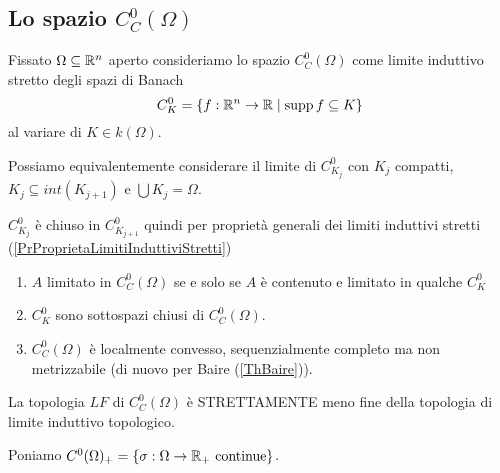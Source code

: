 \subsection{Lo spazio \texorpdfstring{$C_C^0(\Omega)$}{CC0Omega}}

\begin{definition}
Fissato $\Omega\subseteq\mathbb{R}^n$ aperto consideriamo lo spazio $C_C^0(\Omega)$ come limite induttivo stretto degli spazi di Banach
\[C^0_K=\left\{{f:\mathbb{R}^n\to \mathbb{R}\mid \operatorname{supp} f\subseteq K}\right\}\]
al variare di $K\in k(\Omega)$.
\end{definition}

\begin{remark}
Possiamo equivalentemente considerare il limite di $C_{K_j}^0$ con $K_j$ compatti, $K_{j}\subseteq int(K_{j+1})$ e $\bigcup K_j=\Omega$.
\end{remark}

\begin{remark}
$C_{K_j}^0$ \`e chiuso in $C^0_{K_{j+1}}$ quindi per propriet\`a generali dei limiti induttivi stretti (\ref{PrProprietaLimitiInduttiviStretti})
\begin{enumerate}
    \item $A$ limitato in $C^0_C(\Omega)$ se e solo se $A$ \`e contenuto e limitato in qualche $C^0_K$
    \item $C^0_K$ sono sottospazi chiusi di $C_C^0(\Omega)$. 
    \item $C_C^0(\Omega)$ \`e localmente convesso, sequenzialmente completo ma non metrizzabile (di nuovo per Baire (\ref{ThBaire})).
\end{enumerate}
\end{remark}


\begin{exercise}
La topologia $LF$ di $C_C^0(\Omega)$ \`e STRETTAMENTE meno fine della topologia di limite induttivo topologico.
\end{exercise}

\begin{notation}
Poniamo $C^0(\Omega)_+=\left\{{\sigma:\Omega\to\mathbb{R}_+\text{ continue}}\right\}$.
\end{notation}

